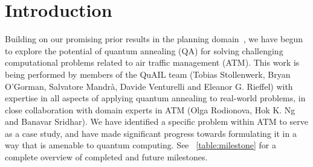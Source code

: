 \section*{Introduction}\label{sec:intro}
Building on our promising prior results in the planning domain~\cite{rieffel:15,venturelli:15},
we have begun to explore the potential of quantum annealing (QA) for solving challenging computational problems related to air traffic management (ATM)\cite{rodionova:16, rodionova:thesis15}.
This work is being performed by members of the QuAIL team (Tobias Stollenwerk, Bryan O'Gorman, Salvatore Mandr\`a, Davide Venturelli and Eleanor G. Rieffel) with expertise in all aspects of applying quantum annealing to real-world problems, in close collaboration with domain experts in ATM (Olga Rodionova, Hok K. Ng and Banavar Sridhar).
We have identified a specific problem within ATM to serve as a case study, and have made significant progress towards formulating it in a way that is amenable to quantum computing.
See \tablename~\ref{table:milestone} for a complete overview of completed and future milestones.
